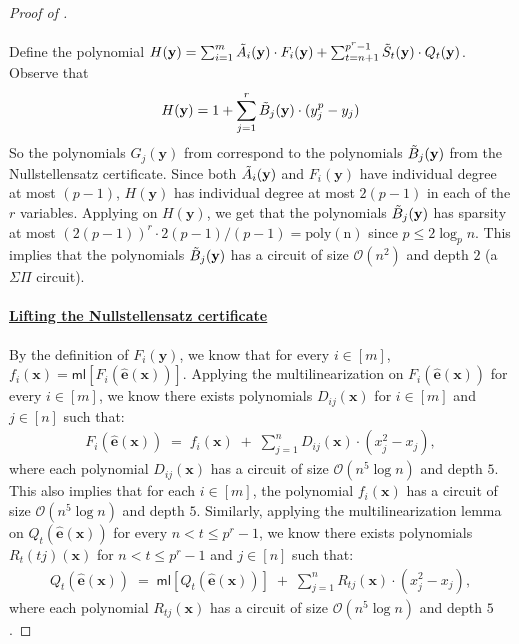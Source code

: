 \documentclass[11pt]{article}
\newcommand{\bigO}{\mathcal{O}}
\newcommand{\ml}{\mathsf{ml}}
\begin{document}
\begin{proof}[Proof of ]
\paragraph{}Define the polynomial $H(\mathbf{y}) = \sum_{i = 1}^{m} \Tilde{A}_{i}(\mathbf{y}) \cdot F_{i}(\mathbf{y}) + \sum_{t=n+1}^{p^{r}-1} \Tilde{S}_{t}(\mathbf{y}) \cdot Q_{t}(\mathbf{y})$. Observe that
\begin{align*}
    H(\mathbf{y}) = 1 + \sum_{j = 1}^{r} \Tilde{B}_{j}(\mathbf{y}) \cdot (y_{j}^{p} - y_{j})
\end{align*}
So the polynomials $G_{j}(\mathbf{y})$ from  correspond to the polynomials $\Tilde{B}_{j}(\mathbf{y})$ from the Nullstellensatz certificate.
Since both $\Tilde{A}_{i}(\mathbf{y})$ and $F_{i}(\mathbf{y})$ have individual degree at most $(p-1)$, $H(\mathbf{y})$ has individual degree at most $2(p-1)$ in each of the $r$ variables. Applying  on $H(\mathbf{y})$, we get that the polynomials $\Tilde{B}_{j}(\mathbf{y})$ has sparsity at most $(2(p-1))^{r} \cdot 2(p-1)/(p-1) = \mathrm{poly(n)}$ since $p \leq 2 \log_{p} n$. This implies that the polynomials $\Tilde{B}_{j}(\mathbf{y})$ has a circuit of size $\bigO(n^{2})$ and depth $2$ (a $\Sigma \Pi$ circuit).

\paragraph{\underline{Lifting the Nullstellensatz certificate}}By the definition of $F_{i}(\mathbf{y})$, we know that for every $i \in [m]$, $f_{i}(\mathbf{x}) = \ml[F_{i}(\widehat{\mathbf{e}}(\mathbf{x}))]$. Applying the multilinearization  on $F_{i}(\widehat{\mathbf{e}}(\mathbf{x}))$ for every $i \in [m]$, we know there exists polynomials $D_{ij}(\mathbf{x})$ for $i \in [m]$ and $j \in [n]$ such that:
\begin{align*}
    F_{i}(\widehat{\mathbf{e}}(\mathbf{x})) \; = \; f_{i}(\mathbf{x}) \; + \; \sum_{j = 1}^{n} D_{ij}(\mathbf{x}) \cdot (x_{j}^{2} - x_{j}),
\end{align*}
where each polynomial $D_{ij}(\mathbf{x})$ has a circuit of size $\bigO(n^{5} \log n)$ and depth $5$. This also implies that for each $i \in [m]$, the polynomial $f_{i}(\mathbf{x})$ has a circuit of size $\bigO(n^{5} \log n)$ and depth $5$.\newline
Similarly, applying the multilinearization lemma  on $Q_{t}(\widehat{\mathbf{e}}(\mathbf{x}))$ for every $n < t \leq p^{r}-1$, we know there exists polynomials $R_{t}(tj)(\mathbf{x})$ for $n < t \leq p^{r}-1$ and $j \in [n]$ such that:
\begin{align*}
    Q_{t}(\widehat{\mathbf{e}}(\mathbf{x})) \; = \; \ml[Q_{t}(\widehat{\mathbf{e}}(\mathbf{x}))] \; + \; \sum_{j=1}^{n} R_{tj}(\mathbf{x}) \cdot (x_{j}^{2} - x_{j}),
\end{align*}
where each polynomial $R_{tj}(\mathbf{x})$ has a circuit of size $\bigO(n^{5} \log n)$ and depth $5$.


\end{proof}
\end{document}
